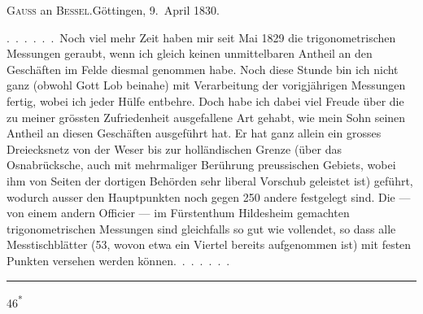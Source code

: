 \begin{center}
\textsc{Gauss} an \textsc{Bessel}.\quad Göttingen, 9.~April 1830.
\end{center}

\par\noindent\hspace*{\parindent}.\ .\ .\ .\ .\ .\ Noch viel mehr Zeit haben mir seit Mai 1829 die trigonometrischen Messungen geraubt, wenn ich gleich keinen unmittelbaren Antheil an den Geschäften im Felde diesmal genommen habe.
Noch diese Stunde bin ich nicht ganz (obwohl Gott Lob beinahe) mit Verarbeitung der vorigjährigen Messungen fertig, wobei ich jeder Hülfe entbehre.
Doch habe ich dabei viel Freude über die zu meiner grössten Zufriedenheit ausgefallene Art gehabt, wie mein Sohn seinen Antheil an diesen Geschäften ausgeführt hat.
Er hat ganz allein ein grosses Dreiecksnetz von der Weser bis zur holländischen Grenze (über das Osnabrücksche, auch mit mehrmaliger Berührung preussischen Gebiets, wobei ihm von Seiten der dortigen Behörden sehr liberal Vorschub geleistet ist) geführt, wodurch ausser den Hauptpunkten noch gegen 250 andere festgelegt sind.
Die --- von einem andern Officier --- im Fürstenthum Hildesheim gemachten trigonometrischen Messungen sind gleichfalls so gut wie vollendet, so dass alle Messtischblätter (53, wovon etwa ein Viertel bereits aufgenommen ist) mit festen Punkten versehen werden können.\ .\ .\ .\ .\ .\ .

\begin{center}\rule{.24\linewidth}{.4pt}\end{center}
\par\smallskip\noindent\hfill{\footnotesize 46\textsuperscript{*}}\par
